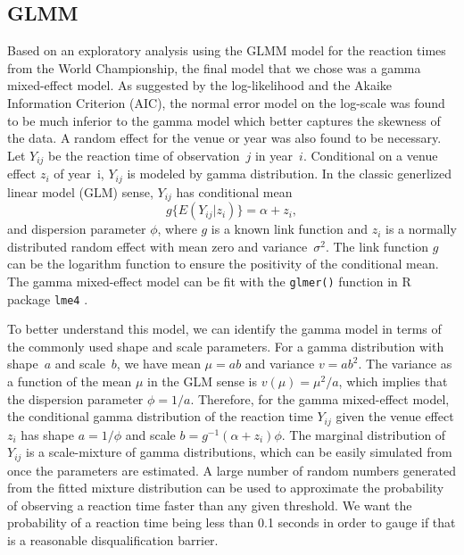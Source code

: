 \documentclass[12pt, letterpaper, titlepage]{article}
\begin{document}
\subsection{GLMM}
Based on an exploratory analysis using the GLMM model for the reaction times
from the World Championship, the final model that we chose was a gamma
mixed-effect model. As suggested by the log-likelihood and the Akaike Information
Criterion (AIC), the normal error model on the log-scale was found to be
much inferior to the gamma model which better captures the skewness of the
data. A random effect for the venue or year was also found to be necessary.
Let $Y_{ij}$ be the reaction time of observation~$j$ in year~$i$.
Conditional on a venue effect $z_i$ of year~i,  $Y_{ij}$ is modeled by 
gamma distribution. In the classic generlized linear model (GLM) sense,
$Y_{ij}$ has conditional mean
\[
g\{E(Y_{ij} | z_i)\} = \alpha + z_i,
\]
and dispersion parameter $\phi$, where $g$ is a known link function and
$z_i$ is a normally distributed random effect with mean zero and
variance~$\sigma^2$. The link function $g$ can be the logarithm function to
ensure the positivity of the conditional mean.
The gamma mixed-effect model can be fit with the \texttt{glmer()} function in R
package \texttt{lme4} \citep{lme4}.


To better understand this model, we can identify the gamma model in terms of the
commonly used shape and scale parameters. For a gamma distribution with
shape~$a$ and scale~$b$, we have mean $\mu = ab$ and variance $v = ab^2$. The
variance as a function of the mean $\mu$ in the GLM sense is
$v(\mu) = \mu^2 / a$, which implies that the dispersion parameter
$\phi = 1 / a$. Therefore, for the gamma mixed-effect model, the conditional
gamma distribution of the reaction time $Y_{ij}$ given the venue effect $z_i$
has shape $a = 1 / \phi$ and scale $b = g^{-1}(\alpha + z_i) \phi$. The marginal
distribution of $Y_{ij}$ is a scale-mixture of gamma distributions, which can be
easily simulated from once the parameters are estimated. A large number of
random numbers generated from the fitted mixture distribution can be used to
approximate the probability of observing a reaction time faster than any given
threshold.  We want the probability of a reaction time being less than 0.1
seconds in order to gauge if that is a reasonable disqualification barrier.
\end{document}
